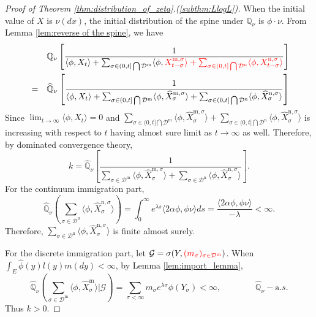 \documentclass[12pt,a4paper]{amsart}
\numberwithin{equation}{section}
\theoremstyle{plain}
\theoremstyle{definition}
\begin{document}
\begin{proof}[Proof of Theorem \ref{thm:distribution_of_zeta}.(\ref{subthm:LlogL})]
	When the initial value of $X$ is $\nu(dx)$, the initial distribution of the spine under $\mathbb Q_\nu$ is $\phi\cdot\nu$.
	From Lemma \ref{lem:reverse of the spine}, we have
  \begin{eqnarray*}\label{eq:duality}
    &&  \mathbb Q_{\nu}\left[\frac{1}{\langle\phi, X_{t}\rangle +\sum_{\sigma\in(0, t]\bigcap\mathcal D^{\mathrm m}}\langle \phi,{\color{red} X_{t-\sigma}^{{\mathrm m},\sigma}\rangle +\sum_{\sigma\in (0, t]\bigcap \mathcal D^{\mathrm n}}\langle \phi, X_{t-\sigma}^{{\mathrm n}, \sigma}\rangle} }\right]\\
    &=&\widehat{\mathbb Q}_{\nu}\left[\frac{1}{\langle\phi, X_{t}\rangle +\sum_{\sigma\in(0, t]\bigcap\mathcal D^{\mathrm m}}\langle \phi, \widehat X_{\sigma}^{{\mathrm m},\sigma}\rangle +\sum_{\sigma\in (0, t]\bigcap \mathcal D^{\mathrm n}}\langle \phi, \widehat X_{\sigma}^{{\mathrm n},\sigma}\rangle }\right]
  \end{eqnarray*}
  Since $\lim_{t\to\infty}\langle\phi, X_{t}\rangle=0$ and $\sum_{\sigma\in(0, t]\bigcap\mathcal D^{\mathrm m}}\langle \phi, \widehat X_{\sigma}^{{\mathrm m},\sigma}\rangle +\sum_{\sigma\in (0, t]\bigcap \mathcal D^{\mathrm n}}\langle \phi, \widehat X_{\sigma}^{{\mathrm n},\sigma}\rangle $ is increasing with respect to $t$ having almost sure limit as $t\to\infty$ as well.  Therefore, by dominated convergence theory,
  \begin{equation}\label{eq:cons}
    k=\widehat{\mathbb Q}_{\nu}\left[\frac{1}{\sum_{\sigma\in\mathcal D^{\mathrm m}}\langle \phi, \widehat X_{\sigma}^{{\mathrm m},\sigma}\rangle +\sum_{\sigma\in \mathcal D^{\mathrm n}}\langle \phi, \widehat X_{\sigma}^{{\mathrm n},\sigma}\rangle }\right].
  \end{equation}
	For the continuum immigration part,
  \[
    \widehat{\mathbb Q}_{\nu}\left(\sum_{\sigma\in \mathcal D^{\mathrm n}}\langle \phi, \widehat X_{\sigma}^{{\mathrm n},\sigma}\rangle \right)=\int_0^\infty e^{\lambda s}\langle 2\alpha\phi, \phi\nu\rangle  ds=\frac{\langle 2\alpha\phi, \phi\nu\rangle}{-\lambda}<\infty.
  \]
	Therefore, $\sum_{\sigma\in \mathcal D^{\mathrm n}}\langle \phi, \widehat X_{\sigma}^{{\mathrm n},\sigma}\rangle$ is finite almost surely.

	For the discrete immigration part, let $\mathcal G=\sigma(Y, {\color{red}( m_\sigma)_{\sigma\in\mathcal D^{\mathrm m}}})$.  When  $\int_E\widehat{\phi}(y)l(y)m(dy)<\infty$, by Lemma \ref{lem:import_lemma},
  \[
    \widehat{\mathbb Q}_{\nu}\left(\sum_{\sigma\in \mathcal D^{\mathrm m}}\langle \phi, \widehat X_{\sigma}^{{\mathrm m}}\rangle\Big|\mathcal G \right)
    =\sum_{\sigma<\infty}m_\sigma e^{\lambda \sigma}\phi(Y_{\sigma})<\infty,  \qquad\qquad \widehat{\mathbb Q}_{\nu}-{\mathrm a.s.}
  \]
	Thus $k>0$.


\end{proof}
\end{document}
